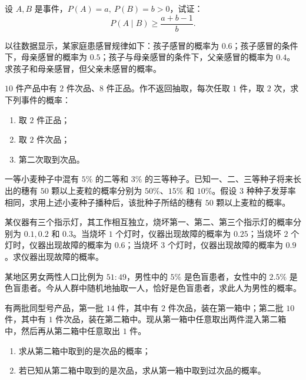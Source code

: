 \begin{homework}[1.20]
设 $A,B$ 是事件，$P(A)=a,\ P(B)=b>0$，试证：
\[
P(A \mid B) \ge \frac{a+b-1}{b}.
\]
\end{homework}

\begin{homework}[1.21]
以往数据显示，某家庭患感冒规律如下：孩子感冒的概率为 $0.6$；孩子感冒的条件下，母亲感冒的概率为 $0.5$；孩子与母亲感冒的条件下，父亲感冒的概率为 $0.4$。求孩子和母亲感冒，但父亲未感冒的概率。
\end{homework}

\begin{homework}[1.22]
$10$ 件产品中有 $2$ 件次品、$8$ 件正品。作不返回抽取，每次任取 $1$ 件，取 $2$ 次，求下列事件的概率：

\begin{enumerate}
  \item 取 $2$ 件正品；
  \item 取 $2$ 件次品；
  \item 第二次取到次品。
\end{enumerate}
\end{homework}

\begin{homework}[1.23]
一等小麦种子中混有 $5\%$ 的二等和 $3\%$ 的三等种子。已知一、二、三等种子将来长出的穗有 $50$ 颗以上麦粒的概率分别为 $50\%$、$15\%$ 和 $10\%$。假设 $3$ 种种子发芽率相同，求用上述小麦种子播种后，该批种子所结的穗有 $50$ 颗以上麦粒的概率。
\end{homework}

\begin{homework}[1.24]
某仪器有三个指示灯，其工作相互独立，烧坏第一、第二、第三个指示灯的概率分别为 $0.1, 0.2$ 和 $0.3$。当烧坏 $1$ 个灯时，仪器出现故障的概率为 $0.25$；当烧坏 $2$ 个灯时，仪器出现故障的概率为 $0.6$；当烧坏 $3$ 个灯时，仪器出现故障的概率为 $0.9$。求仪器出现故障的概率。
\end{homework}

\begin{homework}[1.25]
某地区男女两性人口比例为 $51:49$，男性中的 $5\%$ 是色盲患者，女性中的 $2.5\%$ 是色盲患者。今从人群中随机地抽取一人，恰好是色盲患者，求此人为男性的概率。
\end{homework}

\begin{homework}[1.26]
有两批同型号产品，第一批 $14$ 件，其中有 $2$ 件次品，装在第一箱中；第二批 $10$ 件，其中有 $1$ 件次品，装在第二箱中。现从第一箱中任意取出两件混入第二箱中，然后再从第二箱中任意取出 $1$ 件。

\begin{enumerate}
  \item 求从第二箱中取到的是次品的概率；
  \item 若已知从第二箱中取到的是次品，求从第一箱中取到过次品的概率。
\end{enumerate}
\end{homework}

